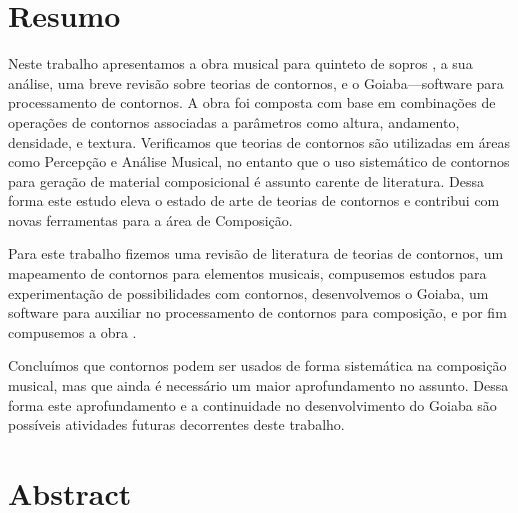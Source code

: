 \chapter*{Resumo}
\label{cha:resumo}

Neste trabalho apresentamos a obra musical para quinteto de sopros
\obra{}, a sua análise, uma breve revisão sobre teorias de contornos,
e o Goiaba---software para processamento de contornos. A obra foi
composta com base em combinações de operações de contornos associadas
a parâmetros como altura, andamento, densidade, e textura. Verificamos
que teorias de contornos são utilizadas em áreas como Percepção e
Análise Musical, no entanto que o uso sistemático de contornos para
geração de material composicional é assunto carente de
literatura. Dessa forma este estudo eleva o estado de arte de teorias
de contornos e contribui com novas ferramentas para a área de
Composição.

Para este trabalho fizemos uma revisão de literatura de teorias de
contornos, um mapeamento de contornos para elementos musicais,
compusemos estudos para experimentação de possibilidades com
contornos, desenvolvemos o Goiaba, um software para auxiliar no
processamento de contornos para composição, e por fim compusemos a
obra \obra{}.

Concluímos que contornos podem ser usados de forma sistemática na
composição musical, mas que ainda é necessário um maior aprofundamento
no assunto. Dessa forma este aprofundamento e a continuidade no
desenvolvimento do Goiaba são possíveis atividades futuras decorrentes
deste trabalho.

\chapter*{Abstract}
\label{cha:abstract}

